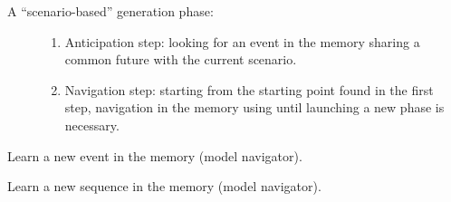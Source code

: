 \documentclass[letterpaper,10pt,english]{sphinxmanual}
\begin{document}
\begin{fulllineitems}
\begin{fulllineitems}
\begin{quote}
\begin{description}
\end{description}\end{quote}
\begin{description}
\item[{A “scenario-based” generation phase:}] \leavevmode\begin{enumerate}
\item {} 
Anticipation step: looking for an event in the memory sharing a common future with the current scenario.

\item {} 
Navigation step: starting from the starting point found in the first step, navigation in the memory using {\hyperref[\detokenize{index:Navigator.Navigator.simply_guided_generation}]{}} until launching a new phase is necessary.

\end{enumerate}

\end{description}

\end{fulllineitems}


\begin{fulllineitems}
\label{\detokenize{index:Generator.Generator.learn_event}}
Learn a new event in the memory (model navigator).

\end{fulllineitems}


\begin{fulllineitems}
\label{\detokenize{index:Generator.Generator.learn_sequence}}
Learn a new sequence in the memory (model navigator).

\end{fulllineitems}



\end{fulllineitems}
\end{document}
